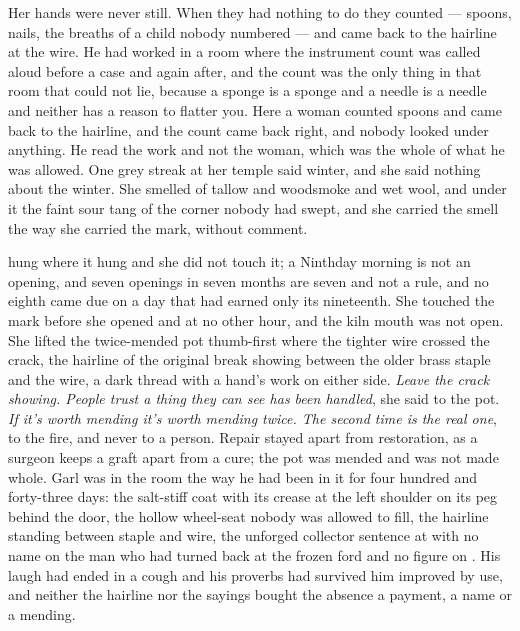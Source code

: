 Her hands were never still. When they had nothing to do they counted --- spoons, nails, the breaths of a child nobody numbered --- and came back to the hairline at the wire. He had worked in a room where the instrument count was called aloud before a case and again after, and the count was the only thing in that room that could not lie, because a sponge is a sponge and a needle is a needle and neither has a reason to flatter you. Here a woman counted spoons and came back to the hairline, and the count came back right, and nobody looked under anything. He read the work and not the woman, which was the whole of what he was allowed. One grey streak at her temple said winter, and she said nothing about the winter. She smelled of tallow and woodsmoke and wet wool, and under it the faint sour tang of the corner nobody had swept, and she carried the smell the way she carried the mark, without comment.

 hung where it hung and she did not touch it; a Ninthday morning is not an opening, and seven openings in seven months are seven and not a rule, and no eighth came due on a day that had earned only its nineteenth. She touched the mark before she opened  and at no other hour, and the kiln mouth was not open. She lifted the twice-mended pot thumb-first where the tighter wire crossed the crack, the hairline of the original break showing between the older brass staple and the wire, a dark thread with a hand's work on either side. \emph{Leave the crack showing. People trust a thing they can see has been handled}, she said to the pot. \emph{If it's worth mending it's worth mending twice. The second time is the real one}, to the fire, and never to a person. Repair stayed apart from restoration, as a surgeon keeps a graft apart from a cure; the pot was mended and was not made whole. Garl was in the room the way he had been in it for four hundred and forty-three days: the salt-stiff coat with its crease at the left shoulder on its peg behind the door, the hollow wheel-seat nobody was allowed to fill, the hairline standing between staple and wire, the unforged collector sentence at  with no name on the man who had turned back at the frozen ford and no figure on . His laugh had ended in a cough and his proverbs had survived him improved by use, and neither the hairline nor the sayings bought the absence a payment, a name or a mending.

